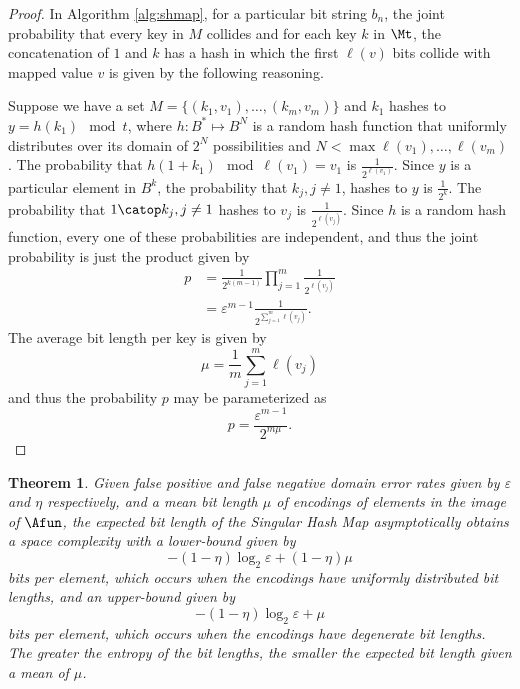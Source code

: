 \documentclass[
]{article}
\newtheorem{theorem}{Theorem}[section]
\theoremstyle{definition}
\theoremstyle{definition}
\theoremstyle{definition}
\theoremstyle{definition}
\theoremstyle{remark}
\begin{document}
\begin{proof}
In Algorithm \ref{alg:shmap}, for a particular bit string \(b_n\), the joint probability that every key in \(M\) collides and for each key \(k\) in \(\Mt\), the concatenation of \(1\) and \(k\) has a hash in which the first \(\ell(v)\) bits collide with mapped value \(v\) is given by the following reasoning.

Suppose we have a set \(M = \{(k_1,v_1),\ldots,(k_m,v_m)\}\) and \(k_1\) hashes to \(y = h(k_1) \mod t\), where
\(h : B^* \mapsto B^N\) is a random hash function that uniformly distributes over its domain of \(2^N\) possibilities and
\(N < \max{\ell(v_1),\ldots,\ell(v_m)}\).
The probability that \(h(1 + k_1) \mod \ell(v_1) = v_1\) is \(\frac{1}{2^{\ell(v_1)}}\).
Since \(y\) is a particular element in \(B^k\), the probability that \(k_j, j \neq 1\), hashes to \(y\) is \(\frac{1}{2^k}\).
The probability that \(1 \catop k_j, j \neq 1\) hashes to \(v_j\) is \(\frac{1}{2^{\ell(v_j)}}\).
Since \(h\) is a random hash function, every one of these probabilities are independent, and thus the joint probability is just the product given by
\begin{align}
    p &= \frac{1}{2^{k(m-1)}} \prod_{j=1}^{m} \frac{1}{2^{\ell(v_j)}}\\
      &= \varepsilon^{m-1} \frac{1}{2^{\sum_{j=1}^{m} \ell(v_j)}}.
\end{align}
The average bit length per key is given by
\begin{equation}
    \mu = \frac{1}{m} \sum_{j=1}^{m} \ell(v_j)
\end{equation}
and thus the probability \(p\) may be parameterized as
\begin{equation}
    p = \frac{\varepsilon^{m-1}}{2^{m \mu}}.
\end{equation}
\end{proof}

\begin{theorem}
Given false positive and false negative domain error rates given by \(\varepsilon\) and \(\eta\) respectively, and a mean bit length \(\mu\) of encodings of elements in the image of \(\Afun\), the expected bit length of the Singular Hash Map asymptotically obtains a space complexity with a lower-bound given by
\begin{equation}
    -(1 - \eta) \log_2 \varepsilon + (1 - \eta) \mu
\end{equation}
bits per element, which occurs when the encodings have uniformly distributed bit lengths, and an upper-bound given by
\begin{equation}
    -(1 - \eta) \log_2 \varepsilon + \mu
\end{equation}
bits per element, which occurs when the encodings have degenerate bit lengths. The greater the entropy of the bit lengths, the smaller the expected bit length given a mean of \(\mu\).
\end{theorem}
\end{document}
